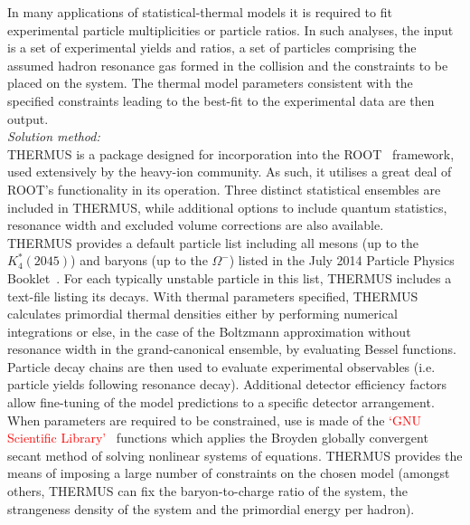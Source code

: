 \documentclass{elsarticle}
\begin{document}
\begin{small}
In many applications of statistical-thermal models it is required to fit experimental 
particle multiplicities or particle ratios. In such analyses, the 
input is a set of experimental yields and ratios, a set of particles comprising 
the assumed hadron resonance gas formed in the collision and the constraints to be placed on the system. The thermal model parameters 
consistent with the specified constraints leading to the best-fit 
to the experimental data are then output.\\    

{\em Solution method:}\\

THERMUS is a package designed for incorporation into the ROOT~\cite{Brun:1997pa} framework, used extensively by the 
heavy-ion community. As such, it utilises a great deal of ROOT's functionality in its operation. Three 
distinct statistical ensembles are included in THERMUS, while additional options to include 
quantum statistics, resonance width and excluded volume corrections are also available.\\

THERMUS provides a default particle list including all mesons (up to the $K_4^*(2045)$) and 
baryons (up to the $\Omega^-$) listed in the July 2014 Particle Physics Booklet~\cite{Agashe:2014kda}.
For each typically unstable particle in 
this list, THERMUS includes a text-file listing its decays. With thermal parameters specified, 
THERMUS calculates primordial thermal densities either by 
performing numerical integrations or else, in the case of the Boltzmann approximation without resonance width in the grand-canonical ensemble, 
by evaluating Bessel functions. Particle decay chains are then used to evaluate 
experimental observables (i.e. particle yields following resonance decay). Additional detector efficiency 
factors allow fine-tuning of the model predictions to a specific detector arrangement.\\

When parameters are required to be constrained, use is made of the 
\textcolor{red}{`GNU Scientific Library'~\cite{Galassi:2009gsl}} functions which applies the Broyden globally
convergent secant method of solving nonlinear systems of equations. THERMUS provides the means 
of imposing a large number of constraints on the chosen model (amongst others, THERMUS can fix the 
baryon-to-charge ratio of the system, the strangeness density of the system and the primordial energy 
per hadron).\\


\end{small}
\end{document}
